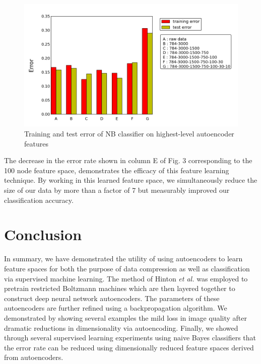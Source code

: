 \documentclass{article}
\begin{document}
\begin{figure}[htbp!]
    \centering
    \includegraphics[width=\textwidth]{trainingAndTestError.png}
    \caption{Training and test error of NB classifier on highest-level autoencoder features}
    \label{fig:error}
\end{figure}%

The decrease in the error rate shown in column E of Fig. 3 corresponding to the 100 node feature space, demonstrates the efficacy of this feature learning technique. By working in this learned feature space, we simultaneously reduce the size of our data by more than a factor of 7 but measurably improved our classification accuracy. 

\section{Conclusion}\label{sec:conclusion}

In summary, we have demonstrated the utility of using autoencoders to learn feature spaces for both the purpose of data compression as well as classification via supervised machine learning. The method of Hinton {\em et al.} was employed to pretrain restricted Boltzmann machines which are then layered together to construct deep neural network autoencoders. The parameters of these autoencoders are further refined using a backpropagation algorithm. We demonstrated by showing several examples the mild loss in image quality after dramatic reductions in dimensionality via autoencoding. Finally, we showed through several supervised learning experiments using naive Bayes classifiers that the error rate can be reduced using dimensionally reduced feature spaces derived from autoencoders.

\nocite{*}
{}

\end{document}
